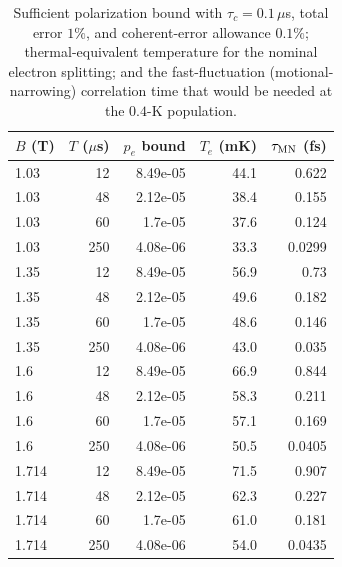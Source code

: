 \begin{table}[htbp]
\centering
\small
\setlength{\tabcolsep}{4pt}
\caption{Sufficient polarization bound with $\tau_c=0.1\,\mu$s, total error $1\%$, and coherent-error allowance $0.1\%$; thermal-equivalent temperature for the nominal electron splitting; and the fast-fluctuation (motional-narrowing) correlation time that would be needed at the $0.4$-K population.}\label{tab:req}
\begin{tabular}{lrrrr}
\toprule
$B$ (T) & $T$ ($\mu$s) & $p_e$ bound & $T_e$ (mK) & $\tau_{\rm MN}$ (fs) \\
\midrule
1.03 & 12 & 8.49e-05 & 44.1 & 0.622 \\
1.03 & 48 & 2.12e-05 & 38.4 & 0.155 \\
1.03 & 60 & 1.7e-05 & 37.6 & 0.124 \\
1.03 & 250 & 4.08e-06 & 33.3 & 0.0299 \\
1.35 & 12 & 8.49e-05 & 56.9 & 0.73 \\
1.35 & 48 & 2.12e-05 & 49.6 & 0.182 \\
1.35 & 60 & 1.7e-05 & 48.6 & 0.146 \\
1.35 & 250 & 4.08e-06 & 43.0 & 0.035 \\
1.6 & 12 & 8.49e-05 & 66.9 & 0.844 \\
1.6 & 48 & 2.12e-05 & 58.3 & 0.211 \\
1.6 & 60 & 1.7e-05 & 57.1 & 0.169 \\
1.6 & 250 & 4.08e-06 & 50.5 & 0.0405 \\
1.714 & 12 & 8.49e-05 & 71.5 & 0.907 \\
1.714 & 48 & 2.12e-05 & 62.3 & 0.227 \\
1.714 & 60 & 1.7e-05 & 61.0 & 0.181 \\
1.714 & 250 & 4.08e-06 & 54.0 & 0.0435 \\
\bottomrule
\end{tabular}
\end{table}
